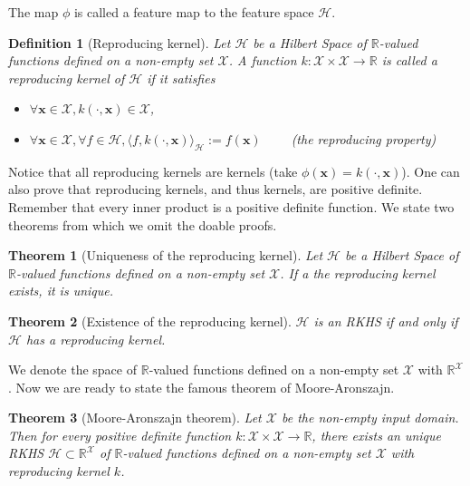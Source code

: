 \documentclass[12pt,a4paper,oneside]{book}
\newtheorem{Definition}{Definition}
\newtheorem{Theorem}{Theorem}
\begin{document}
The map $\phi$ is called a feature map to the feature space $\mathcal{H}$.

\begin{Definition}[Reproducing kernel]
Let $\mathcal{H}$ be a Hilbert Space of $\mathbb{R}$-valued functions defined on a non-empty set $\mathcal{X}$. A function $k: \mathcal{X} \times \mathcal{X} \rightarrow \mathbb{R}$ is called a reproducing kernel of $\mathcal{H}$ if it satisfies 
\begin{itemize}
\item $\forall \bm{x} \in \mathcal{X}, k(\cdot,\bm{x}) \in \mathcal{X}$,
\item $\forall \bm{x} \in \mathcal{X}, \forall f \in \mathcal{H}, \langle f,k(\cdot,\bm{x})\rangle_{\mathcal{H}} := f(\bm{x}) \qquad$ (the reproducing property)
\end{itemize}
\end{Definition}

Notice that all reproducing kernels are kernels (take $\phi(\bm{x}) = k(\cdot,\bm{x})$). One can also prove that reproducing kernels, and thus kernels, are positive definite. Remember that every inner product is a positive definite function. 
We state two theorems from which we omit the doable proofs.

\begin{Theorem}[Uniqueness of the reproducing kernel] 
Let $\mathcal{H}$ be a Hilbert Space of $\mathbb{R}$-valued functions defined on a non-empty set $\mathcal{X}$. If a the reproducing kernel exists, it is unique.
\end{Theorem}

\begin{Theorem}[Existence of the reproducing kernel] 
$\mathcal{H}$ is an RKHS if and only if $\mathcal{H}$ has a reproducing kernel. 
\end{Theorem}

We denote the space of $\mathbb{R}$-valued functions defined on a non-empty set $\mathcal{X}$ with $\mathbb{R}^{\mathcal{X}}$. Now we are ready to state the famous theorem of Moore-Aronszajn.

\begin{Theorem}[Moore-Aronszajn theorem]
Let $\mathcal{X}$ be the non-empty input domain. Then for every positive definite function $k: \mathcal{X} \times \mathcal{X} \rightarrow \mathbb{R}$, there exists an unique RKHS $\mathcal{H} \subset \mathbb{R}^{\mathcal{X}}$ of $\mathbb{R}$-valued functions defined on a non-empty set $\mathcal{X}$  with reproducing kernel $k$.
\end{Theorem}
\end{document}
